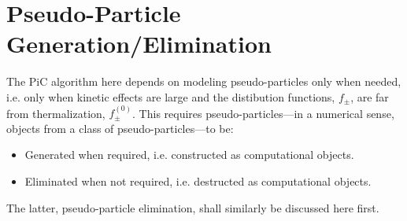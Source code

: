 \section{Pseudo-Particle Generation/Elimination}\label{cha:particle generation}
    The PiC algorithm here depends on modeling pseudo-particles only when needed, i.e. only when kinetic effects are large and the distibution functions, $f_{\pm}$, are far from thermalization, $f_{\pm}^{(0)}$. This requires pseudo-particles---in a numerical sense, objects from a class of pseudo-particles---to be:
    \begin{itemize}
        \item  Generated when required, i.e. constructed as computational objects.
        \item  Eliminated when not required, i.e. destructed as computational objects.
    \end{itemize}
    The latter, pseudo-particle elimination, shall similarly be discussed here first.

    
    
    
    
    